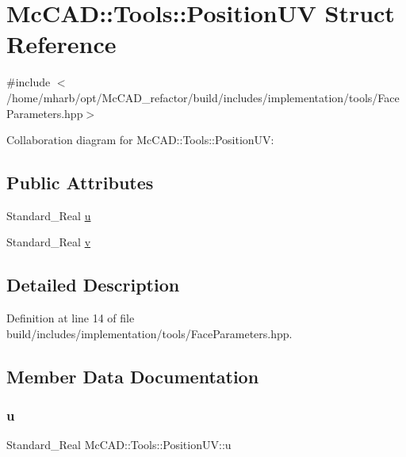 \hypertarget{structMcCAD_1_1Tools_1_1PositionUV}{}\section{Mc\+C\+AD\+:\+:Tools\+:\+:Position\+UV Struct Reference}
\label{structMcCAD_1_1Tools_1_1PositionUV}


{\ttfamily \#include $<$/home/mharb/opt/\+Mc\+C\+A\+D\+\_\+refactor/build/includes/implementation/tools/\+Face\+Parameters.\+hpp$>$}



Collaboration diagram for Mc\+C\+AD\+:\+:Tools\+:\+:Position\+UV\+:
\subsection*{Public Attributes}
\begin{DoxyCompactItemize}
\item 
Standard\+\_\+\+Real \hyperlink{structMcCAD_1_1Tools_1_1PositionUV_a25dc7cfa0fb5089497fc0657c1c45bb8}{u}
\item 
Standard\+\_\+\+Real \hyperlink{structMcCAD_1_1Tools_1_1PositionUV_a01f73f82047d1bf01cbb494fde5451e5}{v}
\end{DoxyCompactItemize}


\subsection{Detailed Description}


Definition at line 14 of file build/includes/implementation/tools/\+Face\+Parameters.\+hpp.



\subsection{Member Data Documentation}
\mbox{\label{structMcCAD_1_1Tools_1_1PositionUV_a25dc7cfa0fb5089497fc0657c1c45bb8}} 
\subsubsection{\texorpdfstring{u}{u}}
{\footnotesize\ttfamily Standard\+\_\+\+Real Mc\+C\+A\+D\+::\+Tools\+::\+Position\+U\+V\+::u}



